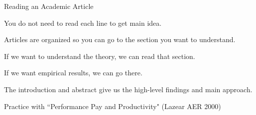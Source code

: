 \documentclass[aspectratio=169,usenames,dvipsnames]{beamer}
\newenvironment{wideitemize}{\itemize\addtolength{\itemsep}{10pt}}{\enditemize}
\begin{document}
\begin{frame}{Reading an Academic Article}

\begin{wideitemize}
    \item You do not need to read each line to get main idea.
    \item Articles are organized so you can go to the section you want to understand.
    \item If we want to understand the theory, we can read that section.
    \item If we want empirical results, we can go there.
    \item The introduction and abstract give us the high-level findings and main approach.
\end{wideitemize}
\end{frame}

\begin{frame}
\centering
    \huge Practice with ``Performance Pay and Productivity" (Lazear AER 2000)
\end{frame}
\end{document}

